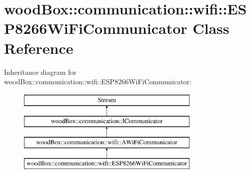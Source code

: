\hypertarget{classwood_box_1_1communication_1_1wifi_1_1_e_s_p8266_wi_fi_communicator}{}\section{wood\+Box\+:\+:communication\+:\+:wifi\+:\+:E\+S\+P8266\+Wi\+Fi\+Communicator Class Reference}
\label{classwood_box_1_1communication_1_1wifi_1_1_e_s_p8266_wi_fi_communicator}
Inheritance diagram for wood\+Box\+:\+:communication\+:\+:wifi\+:\+:E\+S\+P8266\+Wi\+Fi\+Communicator\+:\begin{figure}[H]
\begin{center}
\leavevmode
\includegraphics[height=4.000000cm]{classwood_box_1_1communication_1_1wifi_1_1_e_s_p8266_wi_fi_communicator}
\end{center}
\end{figure}
